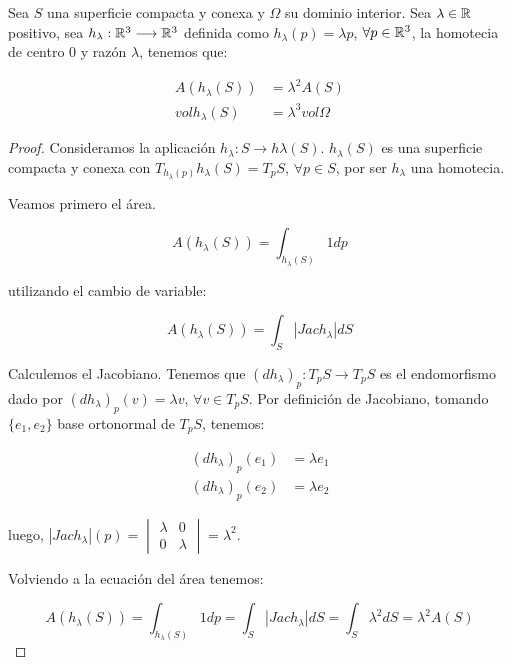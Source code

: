 \begin{lemma}
Sea $S$ una superficie compacta y conexa y $\Omega$ su dominio interior. Sea $\lambda \in \mathbb{R}$ positivo, sea $h_\lambda: \mathbb{R}^3 \longrightarrow \mathbb{R}^3$ definida como $h_\lambda(p)=\lambda p$, $\forall p \in \mathbb{R}^3$, la homotecia de centro 0 y razón $\lambda$, tenemos que:

\begin{align*}
    A(h_\lambda(S)) &= \lambda^2A(S) \\
    vol h_\lambda(S) &= \lambda^3 vol \Omega
\end{align*}
\end{lemma}
\begin{proof}
Consideramos la aplicación $h_\lambda: S \longrightarrow h\lambda(S)$. $h_\lambda(S)$ es una superficie compacta y conexa con $T_{h_\lambda (p)} h_\lambda (S) = T_pS$, $\forall p \in S$, por ser $h_\lambda$ una homotecia.

Veamos primero el área.

\begin{equation*}
    A(h_\lambda(S)) = \int_{h_\lambda(S)} 1dp
\end{equation*}

utilizando el cambio de variable:

\begin{equation*}
    A(h_\lambda(S)) = \int_{S} |Jac h_\lambda| dS
\end{equation*}

Calculemos el Jacobiano. Tenemos que $(dh_\lambda)_p: T_pS \longrightarrow T_pS$ es el endomorfismo dado por $(dh_\lambda)_p(v) = \lambda v$, $\forall v \in T_pS$. Por definición de Jacobiano, tomando $\{e_1, e_2\}$ base ortonormal de $T_pS$, tenemos:

\begin{align*}
    (dh_\lambda)_p(e_1) &= \lambda e_1 \\
    (dh_\lambda)_p(e_2) &= \lambda e_2
\end{align*}

luego, $|Jac h_\lambda|(p) = \begin{vmatrix}
\lambda & 0 \\ 
0 & \lambda
\end{vmatrix} = \lambda^2$.

Volviendo a la ecuación del área tenemos:

\begin{equation*}
    A(h_\lambda(S)) = \int_{h_\lambda(S)} 1dp = \int_{S} |Jac h_\lambda| dS = \int_{S} \lambda^2dS = \lambda^2A(S)
\end{equation*}


\end{proof}
